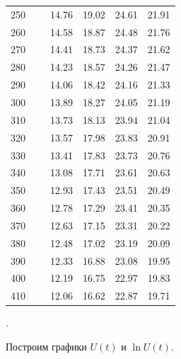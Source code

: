 \documentclass[a4paper, 12pt]{article}
\newcounter{Points}
\newcommand{\point}{\arabic{Points}. \addtocounter{Points}{1}}
\begin{document}
\begin{longtable}{|c|c|c|c|c|c|}
    250	&    ~  & 14.76 & 19.02 & 24.61 & 21.91 \\
    260	&    ~  & 14.58 & 18.87 & 24.48 & 21.76 \\
    270	&    ~  & 14.41 & 18.73 & 24.37 & 21.62 \\
    280	&    ~  & 14.23 & 18.57 & 24.26 & 21.47 \\
    290	&    ~  & 14.06 & 18.42 & 24.16 & 21.33 \\
    300	&    ~  & 13.89 & 18.27 & 24.05 & 21.19 \\
    310	&    ~  & 13.73 & 18.13 & 23.94 & 21.04 \\
    320	&    ~  & 13.57 & 17.98 & 23.83 & 20.91 \\
    330	&    ~  & 13.41 & 17.83 & 23.73 & 20.76 \\
    340	&    ~  & 13.08 & 17.71 & 23.61 & 20.63 \\
    350	&    ~  & 12.93 & 17.43 & 23.51 & 20.49 \\
    360	&    ~  & 12.78 & 17.29 & 23.41 & 20.35 \\
    370	&    ~  & 12.63 & 17.15 & 23.31 & 20.22 \\
    380	&    ~  & 12.48 & 17.02 & 23.19 & 20.09 \\
    390	&    ~  & 12.33 & 16.88 & 23.08 & 19.95 \\
    400	&    ~  & 12.19 & 16.75 & 22.97 & 19.83 \\
    410	&    ~  & 12.06 & 16.62 & 22.87 & 19.71 
\end{longtable}

\point Построим графики $U(t)$ и $\ln U(t)$.
\end{document}
